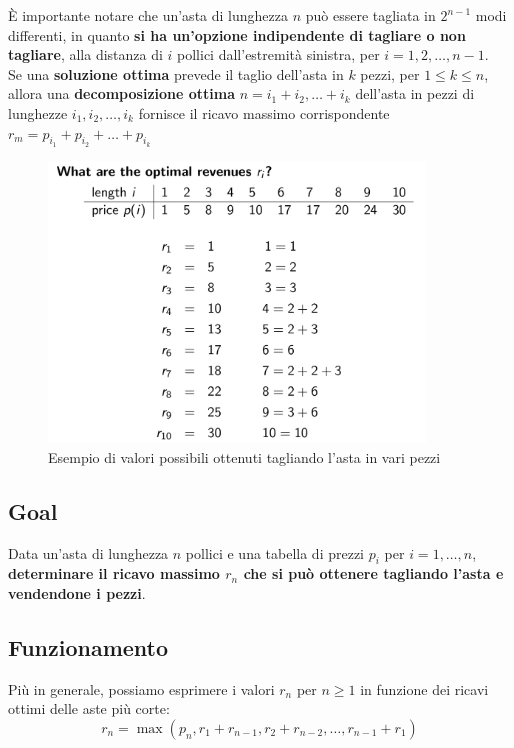 È importante notare che un'asta di lunghezza $n$ può essere tagliata in
$2^{n-1}$ modi differenti, in quanto \textbf{si ha un'opzione
  indipendente di tagliare o non tagliare}, alla distanza di $i$ pollici
dall'estremità sinistra, per $i = 1, 2, \ldots, n-1$.\\

Se una \textbf{soluzione ottima} prevede il taglio dell'asta in $k$
pezzi, per $1 \le k \le n$, allora una \textbf{decomposizione ottima}
$n = i_1 + i_2, \ldots + i_k$ dell'asta in pezzi di lunghezze
$i_1, i_2, \ldots, i_k$ fornisce il ricavo massimo corrispondente
$r_m = p_{i_1} + p_{i_2} + \ldots + p_{i_k}$

\begin{figure}[H]
  \centering
  \includegraphics[width=10cm, keepaspectratio]{capitoli/programmazione_dinamica/imgs/pole3.png}
  \caption{Esempio di valori possibili ottenuti tagliando l'asta in vari pezzi}

\end{figure}

\subsection{Goal}

Data un'asta di lunghezza $n$ pollici e una tabella di prezzi $p_i$
per $i = 1, \ldots, n$, \textbf{determinare il ricavo massimo $r_n$ che
  si può ottenere tagliando l'asta e vendendone i pezzi}.

\subsection{Funzionamento}

Più in generale, possiamo esprimere i valori $r_n$ per $n \ge 1$ in
funzione dei ricavi ottimi delle aste più corte:
$$
  r_n = \max(p_n, r_1 + r_{n-1}, r_2 + r_{n-2}, \ldots, r_{n-1} + r_1)
$$

